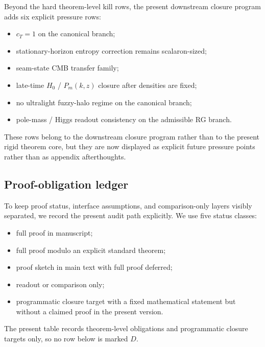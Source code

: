 \begin{tcolorbox}[colback=blue!2, colframe=blue!40!black, breakable,
    title={Downstream pressure rows of the present version}, colbacktitle=blue!55!black]
Beyond the hard theorem-level kill rows, the present downstream closure program adds six explicit
pressure rows:
\begin{itemize}[leftmargin=1.5em, topsep=3pt, itemsep=2pt]
    \item $c_T=1$ on the canonical branch;
    \item stationary-horizon entropy correction remains scalaron-sized;
    \item seam-state CMB transfer family;
    \item late-time $H_0$ / $P_m(k,z)$ closure after densities are fixed;
    \item no ultralight fuzzy-halo regime on the canonical branch;
    \item pole-mass / Higgs readout consistency on the admissible RG branch.
\end{itemize}
These rows belong to the downstream closure program rather than to the present rigid theorem core,
but they are now displayed as explicit future pressure points rather than as appendix afterthoughts.
\end{tcolorbox}

\subsection{Proof-obligation ledger}

To keep proof status, interface assumptions, and comparison-only layers visibly separated, we record
the present audit path explicitly. We use five status classes:
\begin{itemize}[leftmargin=1.4em, topsep=2pt, itemsep=1pt]
    \item[$A$] full proof in manuscript;
    \item[$B$] full proof modulo an explicit standard theorem;
    \item[$C$] proof sketch in main text with full proof deferred;
    \item[$D$] readout or comparison only;
    \item[$P$] programmatic closure target with a fixed mathematical statement but without a claimed proof in the present version.
\end{itemize}
The present table records theorem-level obligations and programmatic closure targets only, so no row below is marked $D$.

